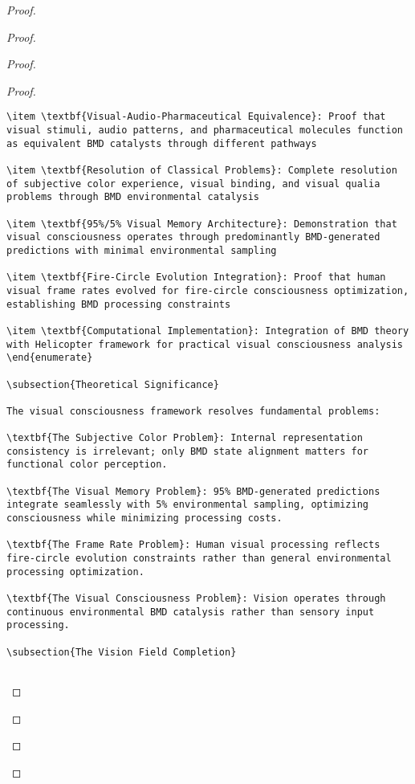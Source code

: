 \documentclass[12pt,a4paper]{article}
\begin{document}
\begin{proof}
{\begin{proof}
\begin{proof}
\begin{proof}
\begin{lstlisting}[style=pythonstyle, caption=Visual Memory BMD Integration]
\item \textbf{Visual-Audio-Pharmaceutical Equivalence}: Proof that visual stimuli, audio patterns, and pharmaceutical molecules function as equivalent BMD catalysts through different pathways

\item \textbf{Resolution of Classical Problems}: Complete resolution of subjective color experience, visual binding, and visual qualia problems through BMD environmental catalysis

\item \textbf{95%/5% Visual Memory Architecture}: Demonstration that visual consciousness operates through predominantly BMD-generated predictions with minimal environmental sampling

\item \textbf{Fire-Circle Evolution Integration}: Proof that human visual frame rates evolved for fire-circle consciousness optimization, establishing BMD processing constraints

\item \textbf{Computational Implementation}: Integration of BMD theory with Helicopter framework for practical visual consciousness analysis
\end{enumerate}

\subsection{Theoretical Significance}

The visual consciousness framework resolves fundamental problems:

\textbf{The Subjective Color Problem}: Internal representation consistency is irrelevant; only BMD state alignment matters for functional color perception.

\textbf{The Visual Memory Problem}: 95% BMD-generated predictions integrate seamlessly with 5% environmental sampling, optimizing consciousness while minimizing processing costs.

\textbf{The Frame Rate Problem}: Human visual processing reflects fire-circle evolution constraints rather than general environmental processing optimization.

\textbf{The Visual Consciousness Problem}: Vision operates through continuous environmental BMD catalysis rather than sensory input processing.

\subsection{The Vision Field Completion}


\end{lstlisting}
\end{proof}
\end{proof}
\end{proof}}
\end{proof}
\end{document}
